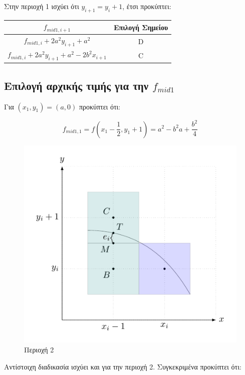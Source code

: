 Στην περιοχή 1 ισχύει ότι $y_{i+1} = y_i + 1$, έτσι προκύπτει:

\begin{table}[htb]
    \centering
    \begin{tabular}{@{}c|c@{}}
        \toprule
        $f_{mid1,i+1}$ & Επιλογή Σημείου \\
        \midrule
        $f_{mid1,i} + 2a^2 y_{i+1} + a^2$ & D \\
        $f_{mid1,i} + 2a^2 y_{i+1} + a^2 - 2b^2 x_{i+1}$ & C \\
        \bottomrule
    \end{tabular}
\end{table}

\subsection{Επιλογή αρχικής τιμής για την $f_{mid1}$}
Για $(x_1, y_1) = (a,0)$ προκύπτει ότι:

\begin{equation}
    f_{mid1,1} = f \left(x_1 - \frac{1}{2}, y_1 + 1 \right) = a^2 - b^2 a + \frac{b^2}{4}
\end{equation}
\begin{figure}[hbt]
  \begin{center}
	\includegraphics[scale=1]{Figures/Chapter1/Ellipse/figure3.pdf}
  \end{center}
  \caption{Περιοχή 2}
\end{figure}
Αντίστοιχη διαδικασία ισχύει και για την περιοχή 2. Συγκεκριμένα προκύπτει ότι:

